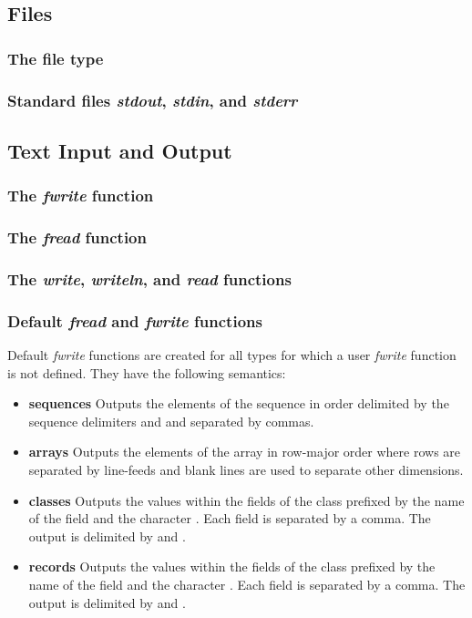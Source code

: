 \label{Input_and_Output}

\subsection{Files}

\subsubsection{The file type}

\subsubsection{Standard files {\em stdout}, {\em stdin}, and {\em stderr}}

\subsection{Text Input and Output}

\subsubsection{The {\em fwrite} function}

\subsubsection{The {\em fread} function}

\subsubsection{The {\em write}, {\em writeln}, and {\em read} functions}

\subsubsection{Default {\em fread} and {\em fwrite} functions}

Default {\em fwrite} functions are created for all types for which a
user {\em fwrite} function is not defined.  They have the following
semantics:
\begin{itemize}
\item
{\bf sequences} Outputs the elements of the sequence in order
delimited by the sequence delimiters \chpl{(/} and \chpl{/)} and
separated by commas.
\item
{\bf arrays} Outputs the elements of the array in row-major order
where rows are separated by line-feeds and blank lines are used to
separate other dimensions.
\item
{\bf classes} Outputs the values within the fields of the class
prefixed by the name of the field and the character \chpl{=}.  Each
field is separated by a comma.  The output is delimited by \chpl{\{}
and \chpl{\}}.
\item
{\bf records} Outputs the values within the fields of the class
prefixed by the name of the field and the character \chpl{=}.  Each
field is separated by a comma.  The output is delimited by \chpl{(}
and \chpl{)}.
\end{itemize}

